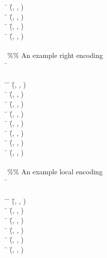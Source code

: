 \documentclass{AISB2008}
\begin{document}
\begin{listing}
{\begin{hetcasl}
\> \Ax{\bullet} \= (\=, , ) \Ax{=} \\
\> \Ax{\bullet} \= (\=, , ) \Ax{=} \\
\> \Ax{\bullet} \= (\=, , ) \Ax{=} \\
\> \Ax{\bullet} \= (\=, , ) \Ax{=} \\
\\
\%\% An example right encoding\\
\SPEC \= \Ax{=}\\
\> \\
\THEN \=\Ax{\bullet} \= (\=, , ) \Ax{=} \\
\> \Ax{\bullet} \= (\=, , ) \Ax{=} \\
\> \Ax{\bullet} \= (\=, , ) \Ax{=} \\
\> \Ax{\bullet} \= (\=, , ) \Ax{=} \\
\> \Ax{\bullet} \= (\=, , ) \Ax{=} \\
\> \Ax{\bullet} \= (\=, , ) \Ax{=} \\
\> \Ax{\bullet} \= (\=, , ) \Ax{=} \\
\> \Ax{\bullet} \= (\=, , ) \Ax{=} \\
\\
\%\% An example local encoding\\
\SPEC \= \Ax{=}\\
\> \\
\THEN \=\Ax{\bullet} \= (\=, , ) \Ax{=} \\
\> \Ax{\bullet} \= (\=, , ) \Ax{=} \\
\> \Ax{\bullet} \= (\=, , ) \Ax{=} \\
\> \Ax{\bullet} \= (\=, , ) \Ax{=} \\
\> \Ax{\bullet} \= (\=, , ) \Ax{=} \\
\> \Ax{\bullet} \= (\=, , ) \Ax{=} \\

\end{hetcasl}}
\end{listing}
\end{document}

